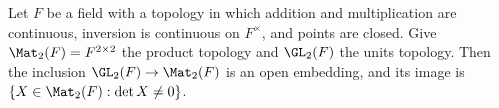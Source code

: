 Let $F$ be a field with a topology in which addition and multiplication are continuous, inversion is continuous on
$F^\times$, and points are closed. Give $\Mat_2(F)=F^{2\times2}$ the product topology and $\GL_2(F)$ the units
topology. Then the inclusion $\GL_2(F)\to\Mat_2(F)$ is an open embedding, and its image is
$\{X\in\Mat_2(F):\det X\neq0\}$.

